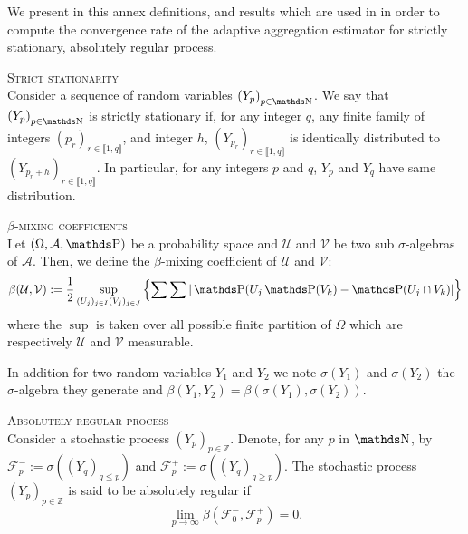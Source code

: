 We present in this annex definitions, and results which are used in  in order to compute the convergence rate of the adaptive aggregation estimator for strictly stationary, absolutely regular process.

\begin{de}{\textsc{Strict stationarity} \\}\label{DE_DEPENDENTDATA_STRICTSTATIONARITY}
Consider a sequence of random variables $\left(Y_{p}\right)_{p \in \N}$.
We say that $\left(Y_{p}\right)_{p \in \N}$ is strictly stationary if, for any integer $q$, any finite family of integers $\left(p_{r}\right)_{r \in \llbracket 1, q\rrbracket}$, and integer $h$, $\left(Y_{p_{r}}\right)_{r \in \llbracket 1, q \rrbracket}$ is identically distributed to $\left(Y_{p_{r} + h}\right)_{r \in \llbracket 1, q \rrbracket}$. In particular, for any integers $p$ and $q$, $Y_{p}$ and $Y_{q}$ have same distribution.
\end{de}

\begin{de}{\textsc{$\beta$-mixing coefficients} \\}\label{DE_DEPENDENTDATA_BETAMIXING}
Let $\left(\Omega, \mathcal{A}, \P\right)$ be a probability space and $\mathcal{U}$ and $\mathcal{V}$ be two sub $\sigma$-algebras of $\mathcal{A}$.
Then, we define the $\beta$-mixing coefficient of $\mathcal{U}$ and $\mathcal{V}$:
\[\beta(\mathcal{U}, \mathcal{V}) := \frac{1}{2} \sup\limits_{(U_{j})_{j \in I}(V_{j})_{j \in J}}\left\{\sum\sum \vert \P(U_{j}\P(V_{k}) - \P(U_{j} \cap V_{k}) \vert \right\}\]
where the $\sup$ is taken over all possible finite partition of $\Omega$ which are respectively $\mathcal{U}$ and $\mathcal{V}$ measurable.

In addition for two random variables $Y_{1}$ and $Y_{2}$ we note $\sigma(Y_{1})$ and $\sigma(Y_{2})$ the $\sigma$-algebra they generate and $\beta\left(Y_{1}, Y_{2}\right) = \beta\left(\sigma(Y_{1}), \sigma(Y_{2})\right)$.
\end{de}

\begin{de}{\textsc{Absolutely regular process} \\}\label{DE_DEPENDENTDATA_ABSOLUTELYREGULAR}
Consider a stochastic process $(Y_{p})_{p \in \mathds{Z}}$.
Denote, for any $p$ in $\N$, by $\mathcal{F}^{-}_{p} := \sigma\left((Y_{q})_{q \leq p}\right)$ and $\mathcal{F}^{+}_{p} := \sigma\left((Y_{q})_{q \geq p}\right)$.
The stochastic process $(Y_{p})_{p \in \mathds{Z}}$ is said to be absolutely regular if
\[\lim\limits_{p \rightarrow \infty} \beta(\mathcal{F}_{0}^{-}, \mathcal{F}_{p}^{+}) = 0.\]
\end{de}


